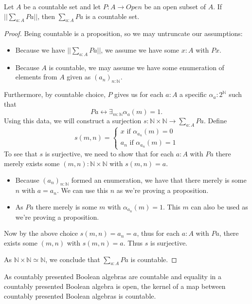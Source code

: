 \begin{lemma}
  Let $A$ be a countable set and let $P:A \to Open$
  be an open subset of $A$. 
  If $||\sum_{a:A} P a||$, then $\sum_{a:A} P a$ is a countable set. 
\end{lemma}
\begin{proof}
  Being countable is a proposition, so we may untruncate our assumptions:
  \begin{itemize}
    \item 
      Because we have $||\sum_{a:A} P a||$, we assume we have  some $x:A$ with $P x$. 
    \item 
      Because $A$ is countable, we may assume we have some 
      enumeration of elements from $A$ given as $(a_n)_{n:\mathbb N}$.
  \end{itemize}
  Furthermore, by countable choice, $P$ gives us 
  for each $a:A$ a specific $\alpha_a:2^\mathbb N$ 
  such that 
  \begin{equation}
    P a \leftrightarrow \exists_{m:\mathbb N} \alpha_a(m) = 1.
  \end{equation}
  Using this data, we will 
  construct a surjection $s:\mathbb N \times \mathbb N \to \sum_{a:A} P a$. 
  Define 
  \begin{equation}
    s(m,n) = 
    \begin{cases}
      x \text{ if } \alpha_{a_n}(m) = 0 \\
      a_n \text{ if } \alpha_{a_n}(m) = 1
    \end{cases}
  \end{equation}
  To see that $s$ is surjective, we need to show that for each $a:A$ with $P a$ there 
  merely exists some $(m,n):\mathbb N \times \mathbb N$ 
  with $s(m,n) = a$. 
  \begin{itemize}
    \item 
  Because $(a_n)_{n:\mathbb N}$ formed an enumeration, we have that 
  there merely is some $n$ with $a = a_n$. 
  We can use this $n$ as we're proving a proposition. 
    \item 
  As $P a$ there merely is some $m$ with $\alpha_{a_n}(m) = 1$. 
  This $m$ can also be used as we're proving a proposition. 
  \end{itemize}
  Now by the above choice $s(m,n) = a_n = a$, 
  thus for each $a:A$ with $P a$, there exists some $(m,n)$ with 
  $s(m,n) = a$. Thus $s$ is surjective. 

  As $\mathbb N \times \mathbb N \simeq \mathbb N$, we conclude that 
  $\sum_{a:A} P a$ is countable. 
\end{proof}
\begin{corollary}
  As countably presented Boolean algebras are countable  
  and equality in a countably presented Boolean algebra is open, 
  the kernel of a map between countably presented Boolean algebras is countable. 
\end{corollary}






